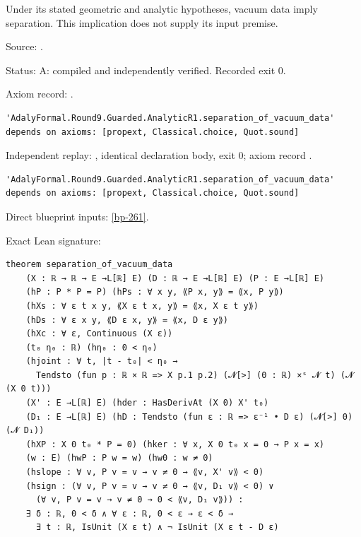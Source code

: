 \begin{theorem}[bp-262]
\label{bp-262}
\leanok
Under its stated geometric and analytic hypotheses, vacuum data imply separation. This implication does not supply its input premise.

\par Source: \texttt{}.
\par Status: A: compiled and independently verified. Recorded exit 0.
\par Axiom record: \texttt{}.
\begin{verbatim}
'AdalyFormal.Round9.Guarded.AnalyticR1.separation_of_vacuum_data' depends on axioms: [propext, Classical.choice, Quot.sound]
\end{verbatim}
\par Independent replay: \texttt{}, identical declaration body, exit 0; axiom record \texttt{}.
\begin{verbatim}
'AdalyFormal.Round9.Guarded.AnalyticR1.separation_of_vacuum_data' depends on axioms: [propext, Classical.choice, Quot.sound]
\end{verbatim}
\par Direct blueprint inputs: \ref{bp-261}.
\par Exact Lean signature:
\begin{verbatim}
theorem separation_of_vacuum_data
    (X : ℝ → ℝ → E →L[ℝ] E) (D : ℝ → E →L[ℝ] E) (P : E →L[ℝ] E)
    (hP : P * P = P) (hPs : ∀ x y, ⟪P x, y⟫ = ⟪x, P y⟫)
    (hXs : ∀ ε t x y, ⟪X ε t x, y⟫ = ⟪x, X ε t y⟫)
    (hDs : ∀ ε x y, ⟪D ε x, y⟫ = ⟪x, D ε y⟫)
    (hXc : ∀ ε, Continuous (X ε))
    (t₀ η₀ : ℝ) (hη₀ : 0 < η₀)
    (hjoint : ∀ t, |t - t₀| < η₀ →
      Tendsto (fun p : ℝ × ℝ => X p.1 p.2) (𝓝[>] (0 : ℝ) ×ˢ 𝓝 t) (𝓝 (X 0 t)))
    (X' : E →L[ℝ] E) (hder : HasDerivAt (X 0) X' t₀)
    (D₁ : E →L[ℝ] E) (hD : Tendsto (fun ε : ℝ => ε⁻¹ • D ε) (𝓝[>] 0) (𝓝 D₁))
    (hXP : X 0 t₀ * P = 0) (hker : ∀ x, X 0 t₀ x = 0 → P x = x)
    (w : E) (hwP : P w = w) (hw0 : w ≠ 0)
    (hslope : ∀ v, P v = v → v ≠ 0 → ⟪v, X' v⟫ < 0)
    (hsign : (∀ v, P v = v → v ≠ 0 → ⟪v, D₁ v⟫ < 0) ∨
      (∀ v, P v = v → v ≠ 0 → 0 < ⟪v, D₁ v⟫)) :
    ∃ δ : ℝ, 0 < δ ∧ ∀ ε : ℝ, 0 < ε → ε < δ →
      ∃ t : ℝ, IsUnit (X ε t) ∧ ¬ IsUnit (X ε t - D ε)
\end{verbatim}
\end{theorem}

